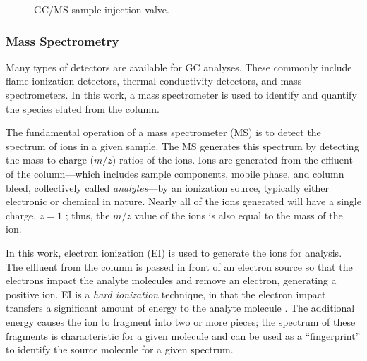 \documentclass[../main.tex]{subfiles}
\begin{document}
\begin{figure}
        {\caption{GC/MS sample injection valve.}
        \label{fig:gcms-valve}}
\end{figure}

\subsubsection{Mass Spectrometry}

Many types of detectors are available for GC analyses. These commonly include
flame ionization detectors, thermal conductivity detectors, and mass
spectrometers. In this work, a mass spectrometer is used to identify and
quantify the species eluted from the column.

The fundamental operation of a mass spectrometer (MS) is to detect the spectrum
of ions in a given sample. The MS generates this spectrum by detecting the
mass-to-charge ($m/z$) ratios of the ions. Ions are generated
from the effluent of the column---which includes sample components, mobile phase,
and column bleed, collectively called \textit{analytes}---by an ionization source,
typically either electronic or chemical in nature. Nearly all of the ions
generated will have a single charge, $z=1$ \cite{Sparkman2011}; thus,
the $m/z$ value of the ions is also equal to the mass of the ion.

In this work, electron ionization (EI) is used to generate the ions for
analysis. The effluent from the column is passed in front of an electron
source so that the electrons impact the analyte molecules and remove an
electron, generating a positive ion. EI is a \textit{hard ionization}
technique, in that the electron impact transfers a significant amount of energy
to the analyte molecule \cite{Sparkman2011}. The additional energy causes
the ion to fragment into two or more pieces; the spectrum of these fragments
is characteristic for a given molecule and can be used as a ``fingerprint''
to identify the source molecule for a given spectrum.
\end{document}
